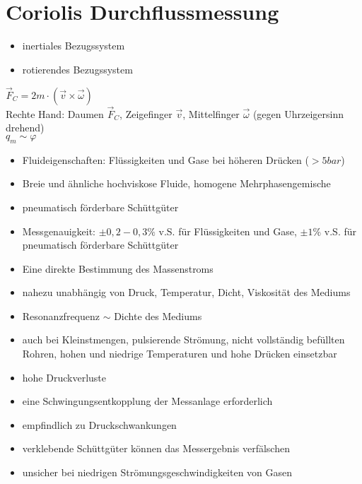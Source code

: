 \documentclass{scrreprt}
\begin{document}
\section{Coriolis Durchflussmessung}
\begin{itemize}
\item inertiales Bezugssystem
\item rotierendes Bezugssystem
\end{itemize}
$\vec{F}_C=2m\cdot (\vec{v}\times \vec{\omega})$\\
Rechte Hand: Daumen $\vec{F}_C$, Zeigefinger $\vec{v}$, Mittelfinger $\vec{\omega}$ (gegen Uhrzeigersinn drehend)\\
$q_m \sim \varphi$

\begin{itemize}
\item Fluideigenschaften: Flüssigkeiten und Gase bei höheren Drücken ($>5\unit{bar}$)
\item Breie und ähnliche hochviskose Fluide, homogene Mehrphasengemische
\item pneumatisch förderbare Schüttgüter
\item Messgenauigkeit: $\pm 0,2 - 0,3\%$ v.S. für Flüssigkeiten und Gase, $\pm 1\%$ v.S. für pneumatisch förderbare Schüttgüter
\end{itemize}
\begin{itemize}[label=$+$]
\item Eine direkte Bestimmung des Massenstroms
\item nahezu unabhängig von Druck, Temperatur, Dicht, Viskosität des Mediums
\item Resonanzfrequenz $\sim$ Dichte des Mediums
\item auch bei Kleinstmengen, pulsierende Strömung, nicht vollständig befüllten Rohren, hohen und niedrige Temperaturen und hohe Drücken einsetzbar
\end{itemize}
\begin{itemize}[label=$-$]
\item hohe Druckverluste
\item eine Schwingungsentkopplung der Messanlage erforderlich
\item empfindlich zu Druckschwankungen
\item verklebende Schüttgüter können das Messergebnis verfälschen
\item unsicher bei niedrigen Strömungsgeschwindigkeiten von Gasen
\end{itemize}
\end{document}
